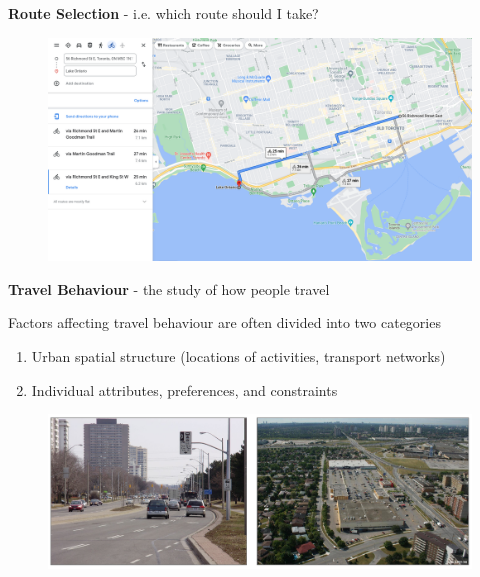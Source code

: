 \documentclass[aspectratio=169]{beamer}
\begin{document}
\begin{frame}
	
	\textbf{Route Selection} - i.e. which route should I take?
	\vspace{4mm}
	
	\begin{figure}
		\centering
		\includegraphics[width=0.98\linewidth]{images/bike_route_selection.png}
	\end{figure}
	
\end{frame}




\begin{frame}
	
	\textbf{Travel Behaviour} - the study of how people travel
	
	\vspace{4mm}
	
	Factors affecting travel behaviour are often divided into two categories
	
	\begin{enumerate}
		
		\item Urban spatial structure (locations of activities, transport networks)
		
		\item Individual attributes, preferences, and constraints
		
	\end{enumerate}


	\begin{figure}
		\centering
		\includegraphics[width=0.98\linewidth]{images/suburbs_tor.png}
	\end{figure}

\end{frame}
\end{document}
